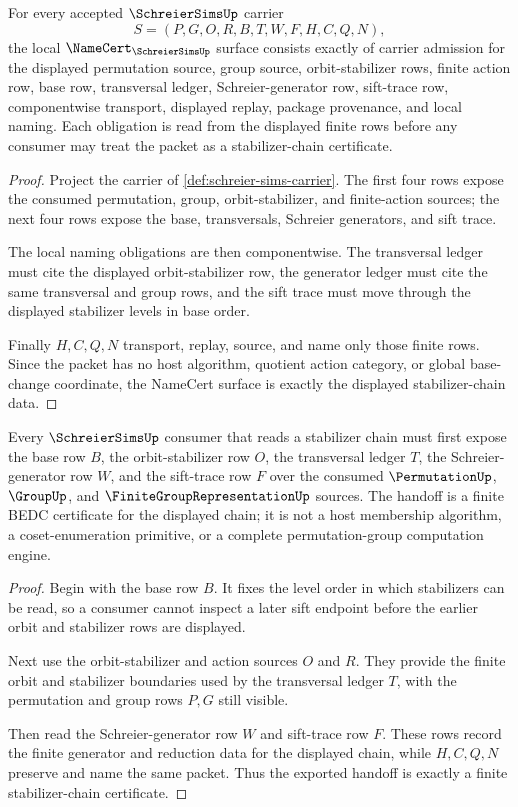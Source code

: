 \begin{theorem}
\label{thm:schreier-sims-namecert-obligations}
For every accepted $\SchreierSimsUp$ carrier
$$
S=(P,G,O,R,B,T,W,F,H,C,Q,N),
$$
the local $\NameCert_{\SchreierSimsUp}$ surface consists exactly of carrier admission for the displayed permutation source, group source, orbit-stabilizer rows, finite action row, base row, transversal ledger, Schreier-generator row, sift-trace row, componentwise transport, displayed replay, package provenance, and local naming. Each obligation is read from the displayed finite rows before any consumer may treat the packet as a stabilizer-chain certificate.
\end{theorem}
\begin{proof}
Project the carrier of \autoref{def:schreier-sims-carrier}. The first four rows expose the consumed permutation, group, orbit-stabilizer, and finite-action sources; the next four rows expose the base, transversals, Schreier generators, and sift trace.

The local naming obligations are then componentwise. The transversal ledger must cite the displayed orbit-stabilizer row, the generator ledger must cite the same transversal and group rows, and the sift trace must move through the displayed stabilizer levels in base order.

Finally $H,C,Q,N$ transport, replay, source, and name only those finite rows. Since the packet has no host algorithm, quotient action category, or global base-change coordinate, the NameCert surface is exactly the displayed stabilizer-chain data.
\end{proof}

\begin{theorem}
\label{thm:schreier-sims-stabilizer-chain-handoff}
Every $\SchreierSimsUp$ consumer that reads a stabilizer chain must first expose the base row $B$, the orbit-stabilizer row $O$, the transversal ledger $T$, the Schreier-generator row $W$, and the sift-trace row $F$ over the consumed $\PermutationUp$, $\GroupUp$, and $\FiniteGroupRepresentationUp$ sources. The handoff is a finite BEDC certificate for the displayed chain; it is not a host membership algorithm, a coset-enumeration primitive, or a complete permutation-group computation engine.
\end{theorem}
\begin{proof}
Begin with the base row $B$. It fixes the level order in which stabilizers can be read, so a consumer cannot inspect a later sift endpoint before the earlier orbit and stabilizer rows are displayed.

Next use the orbit-stabilizer and action sources $O$ and $R$. They provide the finite orbit and stabilizer boundaries used by the transversal ledger $T$, with the permutation and group rows $P,G$ still visible.

Then read the Schreier-generator row $W$ and sift-trace row $F$. These rows record the finite generator and reduction data for the displayed chain, while $H,C,Q,N$ preserve and name the same packet. Thus the exported handoff is exactly a finite stabilizer-chain certificate.
\end{proof}


